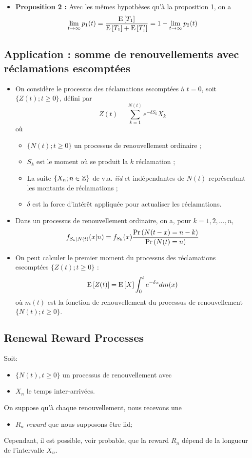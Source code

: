 \documentclass[10pt, french, landscape]{article}
\begin{document}
\begin{multicols*}{2}
\begin{itemize}
\item \textbf{Proposition 2 : } Avec les mêmes hypothèses qu'à la proposition 1, on a
\[\lim_{t \to \infty} p_1(t) = \frac{\mathrm{E} \left[ T_1 \right]}{\mathrm{E} \left[ T_1 \right] + \mathrm{E} \left[ T_1' \right]} = 1 - \lim_{t \to \infty} p_2(t) \]
\end{itemize}

\subsection*{Application : somme de renouvellements avec réclamations escomptées}
\begin{itemize}
\item On considère le processus des réclamations escomptées à $t=0$, soit $\{ Z(t) ; t \geq 0 \}$, défini par
\[Z(t) = \sum_{k=1}^{N(t)} e^{-\delta S_k} X_k  \]
où
\begin{itemize}
	\item $\{N(t) ; t \geq 0 \}$ un processus de renouvellement ordinaire ;
	\item $S_k$ est le moment où se produit la $k$ réclamation ;
	\item La suite $\{ X_n ; n \in \mathbb{Z} \}$ de v.a. \emph{iid} et indépendantes de $N(t)$ représentant les montants de réclamations ;
	\item $\delta$ est la force d'intérêt appliquée pour actualiser les réclamations.
\end{itemize}

\item Dans un processus de renouvellement ordinaire, on a, pour $k = 1, 2, ..., n$,
\begin{align*}
f_{S_k | N(t)}(x | n) = f_{S_k}(x) \frac{\Pr \left( N(t-x) = n-k \right)}{\Pr \left( N(t) = n \right)}
\end{align*}

\item On peut calculer le premier moment du processus des réclamations escomptées $\{ Z(t) ; t \geq 0 \}$ : 
\[\mathrm{E} \left[ Z(t) \right] = \mathrm{E} \left[ X \right] \int_{0}^{t} e^{-\delta x} d m(x) \]
où $m(t)$ est la fonction de renouvellement du processus de renouvellement $\{ N(t) ; t \geq 0 \}$.
\end{itemize}

\subsection*{Renewal Reward Processes}

Soit:
\begin{itemize}
	\item	$\{N(t), t \ge 0\}$ un processus de renouvellement avec
	\item	$X_{n}$ le temps inter-arrivées.
\end{itemize}
On suppose qu'à chaque renouvellement, nous recevons une 
\begin{itemize}
	\item	$R_{n}$ \textit{reward} que nous supposons être iid;
\end{itemize}
Cependant, il est possible, voir probable, que la reward $R_{n}$ dépend de la longueur de l'intervalle $X_{n}$.


\end{multicols*}
\end{document}
